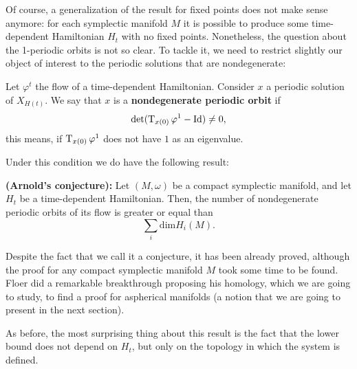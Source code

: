 Of course, a generalization of the result for fixed points does not make sense anymore: for each symplectic manifold $M$ it is possible to produce some time-dependent Hamiltonian $H_t$ with no fixed points. Nonetheless, the question about the 1-periodic orbits is not so clear. To tackle it, we need to restrict slightly our object of interest to the periodic solutions that are nondegenerate:

\begin{deff}
Let $\varphi^t$ the flow of a time-dependent Hamiltonian. Consider $x$ a periodic solution of $X_{H(t)}$. We say that $x$ is a {\bf nondegenerate periodic orbit} if
\[\det(\operatorname T_{x(0)} \varphi^1 - \text{Id}) \neq 0 ,\]
this means, if $\operatorname T_{x(0)} \varphi^1$ does not have $1$ as an eigenvalue.
\end{deff}

Under this condition we do have the following result:

\begin{theo}
{\bf (Arnold's conjecture):} Let $(M,\omega)$ be a compact symplectic manifold, and let $H_t$ be a time-dependent Hamiltonian. Then, the number of nondegenerate periodic orbits of its flow is greater or equal than
\[\sum_i \text{dim}H_i(M) .\]
\end{theo}

Despite the fact that we call it a conjecture, it has been already proved, although the proof for any compact symplectic manifold $M$ took some time to be found. Floer did a remarkable breakthrough proposing his homology, which we are going to study, to find a proof for aspherical manifolds (a notion that we are going to present in the next section).

As before, the most surprising thing about this result is the fact that the lower bound does not depend on $H_t$, but only on the topology in which the system is defined.
